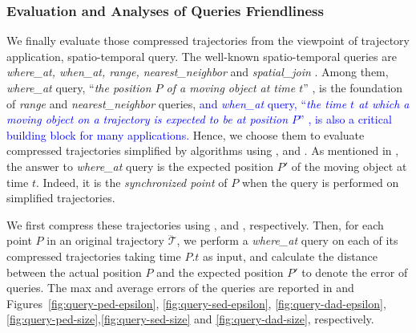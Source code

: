 {\subsubsection{{Evaluation and Analyses of Queries Friendliness}}
\label{sec-exp-query}
We finally evaluate those compressed trajectories from the viewpoint of trajectory application, \ie spatio-temporal query. The well-known spatio-temporal queries are \emph{where\_at, when\_at, range, nearest\_neighbor} and \emph{spatial\_join} \cite{Cao:Spatio,Trajcevski:Uncertainty}. Among them, \emph{where\_at} query, \ie ``\emph{the position $P$ of a moving object at time $t$}'' \cite{Cao:Spatio}, is the foundation of \emph{range} and \emph{nearest\_neighbor} queries, \textcolor{blue}{and \emph{when\_at} query, \ie ``\emph{the time $t$ at which a moving object on a trajectory is expected to be at position $P$}'' \cite{Cao:Spatio}, is also a critical building block for many applications.}
{Hence, we choose them to evaluate compressed trajectories simplified by \lsa algorithms using \ped, \sed and \dad.
As mentioned in \cite{Cao:Spatio,Trajcevski:Uncertainty}, the answer to \emph{where\_at} query is the expected position $P'$ of the moving object at time $t$. Indeed, it is the \emph{synchronized point} of $P$ when the query is performed on simplified trajectories.}

{We first compress these trajectories using \ped, \sed and \dad, respectively. }
{Then, for each point $P$ in an original trajectory $\dddot{\mathcal{T}}$, we perform a \emph{where\_at} query on each of its compressed trajectories taking time $P.t$ as input, and calculate the distance between the actual position $P$ and the expected position $P'$ to denote the error of queries.
}
%
{The max and average errors of the queries are reported in  and Figures~\ref{fig:query-ped-epsilon}, \ref{fig:query-sed-epsilon}, \ref{fig:query-dad-epsilon}, \ref{fig:query-ped-size},\ref{fig:query-sed-size} and \ref{fig:query-dad-size}, respectively.}



}
